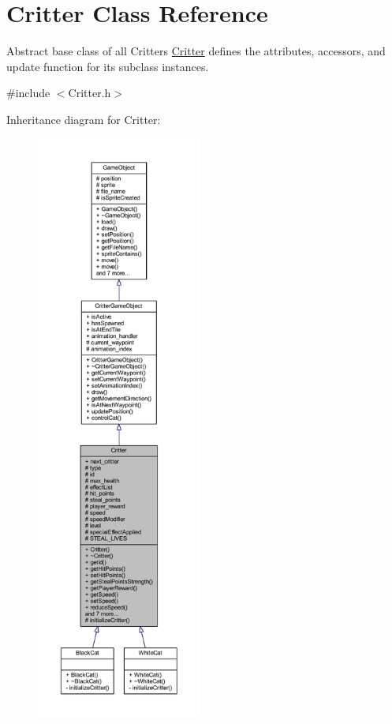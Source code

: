\hypertarget{class_critter}{\section{Critter Class Reference}
\label{class_critter}
}


Abstract base class of all Critters \hyperlink{class_critter}{Critter} defines the attributes, accessors, and update function for its subclass instances.  




{\ttfamily \#include $<$Critter.\+h$>$}



Inheritance diagram for Critter\+:\nopagebreak
\begin{figure}[H]
\begin{center}
\leavevmode
\includegraphics[height=550pt]{class_critter__inherit__graph}
\end{center}
\end{figure}


